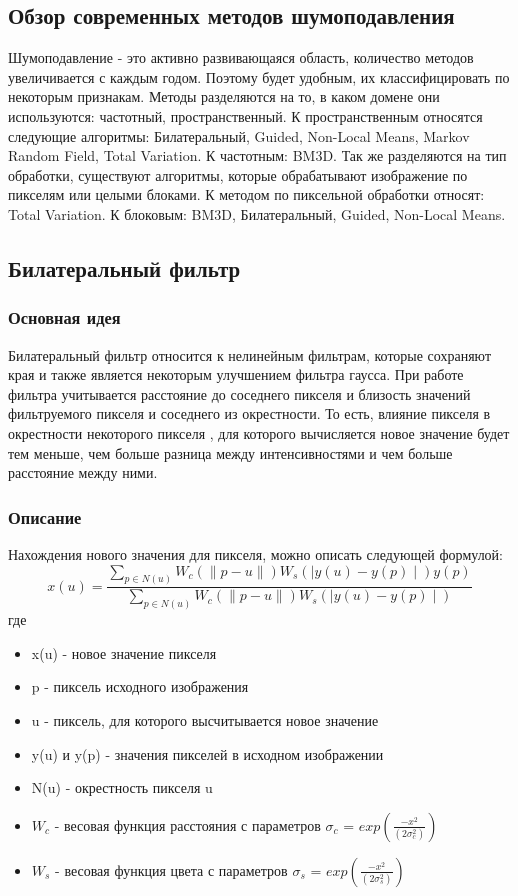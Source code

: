 
\subsection{Обзор современных методов шумоподавления}
Шумоподавление - это активно развивающаяся область, количество методов увеличивается с каждым годом. Поэтому будет удобным, их классифицировать по некоторым признакам. Методы разделяются на то, в каком домене они используются: частотный, пространственный.
К пространственным относятся следующие алгоритмы: Билатеральный, Guided, Non-Local Means, Markov Random Field, Total Variation.
К частотным: BM3D.
Так же разделяются на тип обработки, существуют алгоритмы, которые обрабатывают изображение по пикселям или целыми блоками.
К методом по пиксельной обработки относят: Total Variation.
К блоковым: BM3D, Билатеральный, Guided, Non-Local Means.

\subsection{Билатеральный фильтр}
\subsubsection{Основная идея}
Билатеральный фильтр относится к нелинейным фильтрам, которые сохраняют края и также является некоторым улучшением фильтра гаусса.  При работе фильтра учитывается расстояние до соседнего пикселя и близость значений фильтруемого пикселя и соседнего из окрестности. То есть, влияние пикселя в окрестности некоторого пикселя , для которого вычисляется новое значение будет тем меньше, чем больше разница между интенсивностями и чем больше расстояние между ними\cite{bilateral}.
\subsubsection{Описание}
Нахождения нового значения для пикселя, можно описать следующей формулой:
\begin{equation}
x(u) = \frac{\sum_{p\in N(u)}W_c(\parallel p - u\parallel)W_s(\mid y(u) - y(p)\mid)y(p)}
{\sum_{p\in N(u)}W_c(\parallel p - u\parallel)W_s(\mid y(u) - y(p)\mid)}
\end{equation}
где
\begin{itemize}
\item x(u) - новое значение пикселя
\item p - пиксель исходного изображения
\item u - пиксель, для которого высчитывается новое значение
\item y(u) и y(p) - значения пикселей в исходном изображении
\item N(u) - окрестность пикселя u
\item $W_c$ - весовая функция расстояния с параметров $\sigma_c$ = $exp(\frac{-x^2}{(2\sigma_c^2)})$
\item $W_s$ - весовая функция цвета с параметров $\sigma_s$ = $exp(\frac{-x^2}{(2\sigma_s^2)})$
\end{itemize}

